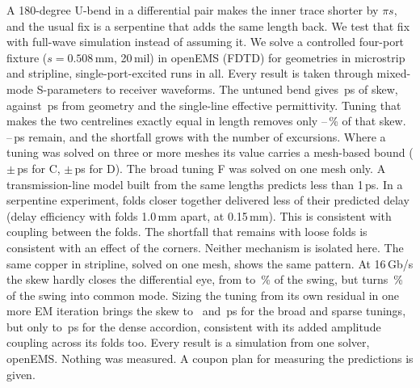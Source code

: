 A 180-degree U-bend in a differential pair makes the inner trace shorter by $\pi s$, and the usual fix is a
serpentine that adds the same length back. We test that fix with full-wave simulation instead of assuming it. We solve a controlled four-port fixture ($s = 0.508$\,mm, 20\,mil) in openEMS (FDTD) for \GeomCount{} geometries in
microstrip and stripline, \RunCount{} single-port-excited runs in all. Every result is taken through mixed-mode
S-parameters to receiver waveforms. The untuned bend gives \SkewB\,ps of skew, against \SkewSingle\,ps from geometry and the
single-line effective permittivity. Tuning that makes the two centrelines exactly equal in length removes only
\RemovedPctD--\RemovedPctF\,\% of that skew. \SkewF--\SkewD\,ps remain, and the shortfall grows with the number
of excursions. Where a tuning was solved on three or more meshes its value carries a mesh-based bound
($\pm$\UncC\,ps for C, $\pm$\UncD\,ps for D). The broad tuning F was solved on one mesh only. A transmission-line model built from the same lengths predicts
less than 1\,ps. In a serpentine experiment, folds closer together delivered less of
their predicted delay (delay efficiency \EtaSloose{} with folds 1.0\,mm apart, \EtaStight{} at 0.15\,mm). This is consistent with coupling between the folds. The shortfall that remains with loose folds is consistent with an
effect of the corners. Neither mechanism is isolated here. The same copper in stripline, solved on one mesh,
shows the same pattern. At 16\,Gb/s the
skew hardly closes the differential eye, from \EyeHA{} to \EyeHB\,\% of the swing, but turns \EyeVcB\,\% of the
swing into common mode. Sizing the tuning from its own residual in one more EM iteration brings the skew to \SkewFcal\ and
\SkewCcal\,ps for the broad and sparse tunings, but only to \SkewDcal\,ps for the dense accordion, consistent with its added amplitude coupling across its
folds too. Every result is a simulation from one solver, openEMS. Nothing was measured. A coupon plan for
measuring the predictions is given.
